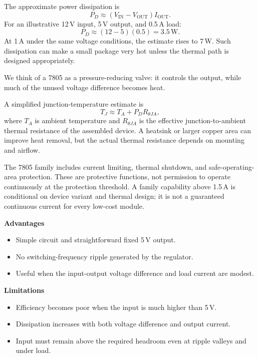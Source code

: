 \documentclass[journal,12pt,twocolumn]{IEEEtran}
\begin{document}
The approximate power dissipation is
\begin{equation}
    \boxed{P_D\approx(V_{\mathrm{IN}}-V_{\mathrm{OUT}})I_{\mathrm{OUT}}.}
    \label{eq:7805-loss}
\end{equation}
For an illustrative 12\,V input, 5\,V output, and 0.5\,A load:
\begin{equation}
    P_D\approx(12-5)(0.5)=3.5\,\mathrm{W}.
\end{equation}
At 1\,A under the same voltage conditions, the estimate rises to
7\,W. Such dissipation can make a small package very hot unless
the thermal path is designed appropriately.

We think of a 7805 as a pressure-reducing valve: it controls the
output, while much of the unused voltage difference becomes heat.

A simplified junction-temperature estimate is
\begin{equation}
    \boxed{T_J\approx T_A+P_D R_{\theta JA},}
    \label{eq:thermal}
\end{equation}
where $T_A$ is ambient temperature and $R_{\theta JA}$ is the
effective junction-to-ambient thermal resistance of the assembled
device. A heatsink or larger copper area can improve heat removal,
but the actual thermal resistance depends on mounting and airflow.

The 7805 family includes current limiting, thermal shutdown, and
safe-operating-area protection. These are protective functions,
not permission to operate continuously at the protection threshold.
A family capability above 1.5\,A is conditional on device variant
and thermal design; it is not a guaranteed continuous current for
every low-cost module.

\textbf{Advantages}
\begin{itemize}[leftmargin=1.5em]
    \item Simple circuit and straightforward fixed 5\,V output.
    \item No switching-frequency ripple generated by the regulator.
    \item Useful when the input-output voltage difference and load
    current are modest.
\end{itemize}
\textbf{Limitations}
\begin{itemize}[leftmargin=1.5em]
    \item Efficiency becomes poor when the input is much higher
    than 5\,V.
    \item Dissipation increases with both voltage difference and
    output current.
    \item Input must remain above the required headroom even at
    ripple valleys and under load.
\end{itemize}
\end{document}
